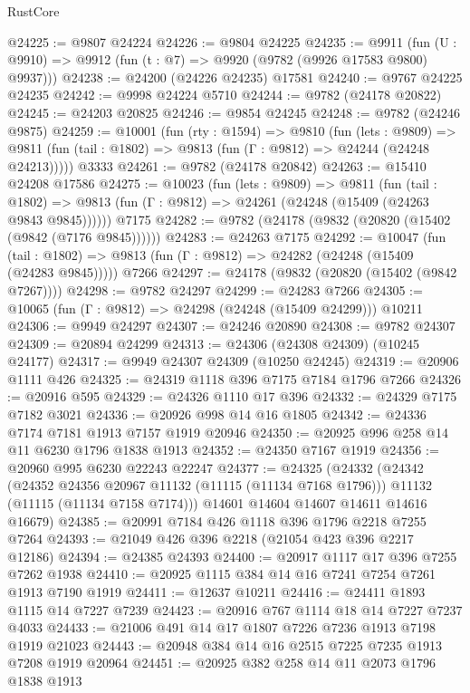 \begin{lexlean}{RustCore}
\begin{coremodule}
@24225 := @9807 @24224
@24226 := @9804 @24225
@24235 := @9911
    (fun (U : @9910) => @9912 (fun (t : @7) => @9920 (@9782 (@9926 @17583 @9800) @9937)))
@24238 := @24200 (@24226 @24235) @17581
@24240 := @9767 @24225 @24235
@24242 := @9998 @24224 @5710
@24244 := @9782 (@24178 @20822)
@24245 := @24203 @20825
@24246 := @9854 @24245
@24248 := @9782 (@24246 @9875)
@24259 := @10001
    (fun (rty : @1594) =>
    @9810
      (fun (lets : @9809) =>
      @9811 (fun (tail : @1802) => @9813 (fun (Γ : @9812) => @24244 (@24248 @24213)))))
    @3333
@24261 := @9782 (@24178 @20842)
@24263 := @15410 @24208 @17586
@24275 := @10023
    (fun (lets : @9809) =>
    @9811
      (fun (tail : @1802) =>
      @9813 (fun (Γ : @9812) => @24261 (@24248 (@15409 (@24263 @9843 @9845))))))
    @7175
@24282 := @9782 (@24178 (@9832 (@20820 (@15402 (@9842 (@7176 @9845))))))
@24283 := @24263 @7175
@24292 := @10047
    (fun (tail : @1802) => @9813 (fun (Γ : @9812) => @24282 (@24248 (@15409 (@24283 @9845)))))
    @7266
@24297 := @24178 (@9832 (@20820 (@15402 (@9842 @7267))))
@24298 := @9782 @24297
@24299 := @24283 @7266
@24305 := @10065 (fun (Γ : @9812) => @24298 (@24248 (@15409 @24299))) @10211
@24306 := @9949 @24297
@24307 := @24246 @20890
@24308 := @9782 @24307
@24309 := @20894 @24299
@24313 := @24306 (@24308 @24309) (@10245 @24177)
@24317 := @9949 @24307 @24309 (@10250 @24245)
@24319 := @20906 @1111 @426
@24325 := @24319 @1118 @396 @7175 @7184 @1796 @7266
@24326 := @20916 @595
@24329 := @24326 @1110 @17 @396
@24332 := @24329 @7175 @7182 @3021
@24336 := @20926 @998 @14 @16 @1805
@24342 := @24336 @7174 @7181 @1913 @7157 @1919 @20946
@24350 := @20925 @996 @258 @14 @11 @6230 @1796 @1838 @1913
@24352 := @24350 @7167 @1919
@24356 := @20960 @995 @6230 @22243 @22247
@24377 := @24325
    (@24332
      (@24342
        (@24352 @24356 @20967 @11132 (@11115 (@11134 @7168 @1796)))
        @11132
        (@11115 (@11134 @7158 @7174)))
      @14601
      @14604
      @14607
      @14611
      @14616
      @16679)
@24385 := @20991 @7184 @426 @1118 @396 @1796 @2218 @7255 @7264
@24393 := @21049 @426 @396 @2218 (@21054 @423 @396 @2217 @12186)
@24394 := @24385 @24393
@24400 := @20917 @1117 @17 @396 @7255 @7262 @1938
@24410 := @20925 @1115 @384 @14 @16 @7241 @7254 @7261 @1913 @7190 @1919
@24411 := @12637 @10211
@24416 := @24411 @1893 @1115 @14 @7227 @7239
@24423 := @20916 @767 @1114 @18 @14 @7227 @7237 @4033
@24433 := @21006 @491 @14 @17 @1807 @7226 @7236 @1913 @7198 @1919 @21023
@24443 := @20948 @384 @14 @16 @2515 @7225 @7235 @1913 @7208 @1919 @20964
@24451 := @20925 @382 @258 @14 @11 @2073 @1796 @1838 @1913

\end{coremodule}
\end{lexlean}
